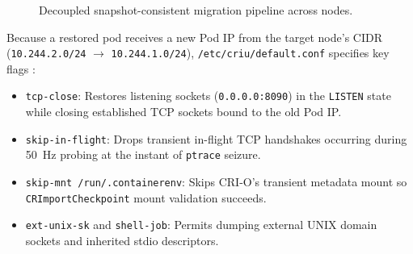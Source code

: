 \documentclass[conference,10pt]{IEEEtran}
\begin{document}
\begin{figure}[t]
\centering
{}
\caption{Decoupled snapshot-consistent migration pipeline across nodes.}
\label{fig:pipeline}
\end{figure}

Because a restored pod receives a new Pod IP from the target node's CIDR (\texttt{10.244.2.0/24} $\to$ \texttt{10.244.1.0/24}), \texttt{/etc/criu/default.conf} specifies key flags \cite{criu}:
\begin{itemize}
    \item \texttt{tcp-close}: Restores listening sockets (\texttt{0.0.0.0:8090}) in the \texttt{LISTEN} state while closing established TCP sockets bound to the old Pod IP.
    \item \texttt{skip-in-flight}: Drops transient in-flight TCP handshakes occurring during 50~Hz probing at the instant of \texttt{ptrace} seizure.
    \item \texttt{skip-mnt /run/.containerenv}: Skips CRI-O's transient metadata mount so \texttt{CRImportCheckpoint} mount validation succeeds.
    \item \texttt{ext-unix-sk} and \texttt{shell-job}: Permits dumping external UNIX domain sockets and inherited stdio descriptors.
\end{itemize}
\end{document}
